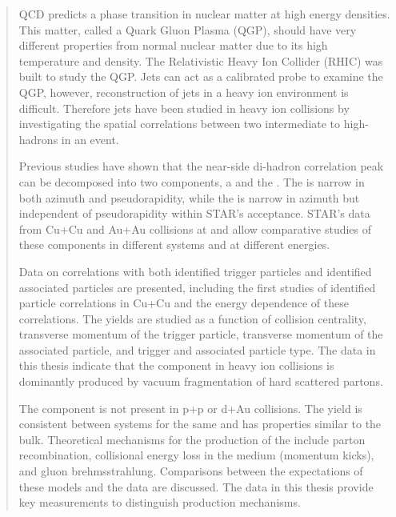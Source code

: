 
\begin{abstract}
QCD predicts a phase transition in nuclear matter at high energy densities.  This matter, called a Quark Gluon Plasma (QGP), should have very different properties from normal nuclear matter due to its high temperature and density.  The Relativistic Heavy Ion Collider (RHIC) was built to study the QGP.  Jets can act as a calibrated probe to examine the QGP, however, reconstruction of jets in a heavy ion environment is difficult.  Therefore jets have been studied in heavy ion collisions by investigating the spatial correlations between two intermediate to high-\pT hadrons in an event.

Previous studies have shown that the near-side di-hadron correlation peak can be decomposed into two components, a \jlc and the \ridge.  The \jlc is narrow in both azimuth and pseudorapidity, while the \ridge is narrow in azimuth but independent of pseudorapidity within STAR's acceptance.  STAR's data from Cu+Cu and Au+Au collisions at \sNNsixtytwo and \sNNtwohundred allow comparative studies of these components in different systems and at different energies.

Data on correlations with both identified trigger particles and identified associated particles are presented, including the first studies of identified particle correlations in Cu+Cu and the energy dependence of these correlations.  The yields are studied as a function of collision centrality,  transverse momentum of the trigger particle, transverse momentum of the associated particle, and trigger and associated particle type.  The data in this thesis indicate that the \jlc component in heavy ion collisions is dominantly produced by vacuum fragmentation of hard scattered partons.

The \ridge component is not present in p+p or d+Au collisions.  The \ridge yield is consistent between systems for the same \npart and has properties similar to the bulk.  Theoretical mechanisms for the production of the \ridge include parton recombination, collisional energy loss in the medium (momentum kicks), and gluon brehmsstrahlung.  Comparisons between the expectations of these models and the data are discussed.  The data in this thesis provide key measurements to distinguish production mechanisms.
\end{abstract}
